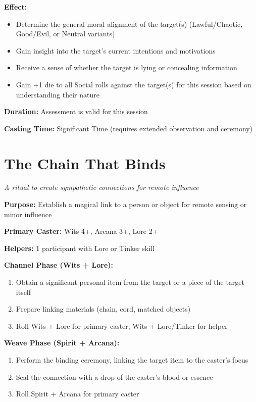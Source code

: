 \textbf{Effect:}
\begin{itemize}
\item Determine the general moral alignment of the target(s) (Lawful/Chaotic, Good/Evil, or Neutral variants)
\item Gain insight into the target's current intentions and motivations
\item Receive a sense of whether the target is lying or concealing information
\item Gain +1 die to all Social rolls against the target(s) for this session based on understanding their nature
\end{itemize}

\textbf{Duration:} Assessment is valid for this session

\textbf{Casting Time:} Significant Time (requires extended observation and ceremony)

\section*{The Chain That Binds}
\textit{A ritual to create sympathetic connections for remote influence}

\textbf{Purpose:} Establish a magical link to a person or object for remote sensing or minor influence

\textbf{Primary Caster:} Wits 4+, Arcana 3+, Lore 2+

\textbf{Helpers:} 1 participant with Lore or Tinker skill

\textbf{Channel Phase (Wits + Lore):}
\begin{enumerate}
\item Obtain a significant personal item from the target or a piece of the target itself
\item Prepare linking materials (chain, cord, matched objects)
\item Roll Wits + Lore for primary caster, Wits + Lore/Tinker for helper
\end{enumerate}

\textbf{Weave Phase (Spirit + Arcana):}
\begin{enumerate}
\item Perform the binding ceremony, linking the target item to the caster's focus
\item Seal the connection with a drop of the caster's blood or essence
\item Roll Spirit + Arcana for primary caster
\end{enumerate}


